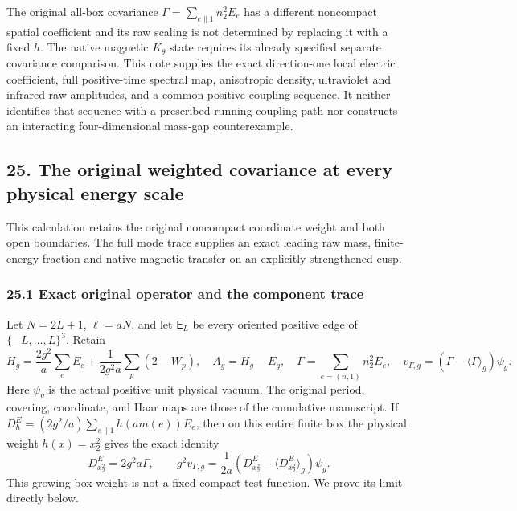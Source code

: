 \documentclass[
  11pt,
]{article}
\begin{document}
The original all-box covariance \(\Gamma=\sum_{e\parallel1}n_2^2E_e\)
has a different noncompact spatial coefficient and its raw scaling is
not determined by replacing it with a fixed \(h\). The native magnetic
\(K_\theta\) state requires its already specified separate covariance
comparison. This note supplies the exact direction-one local electric
coefficient, full positive-time spectral map, anisotropic density,
ultraviolet and infrared raw amplitudes, and a common positive-coupling
sequence. It neither identifies that sequence with a prescribed
running-coupling path nor constructs an interacting four-dimensional
mass-gap counterexample.

\subsection{25. The original weighted covariance at every physical
energy
scale}\label{the-original-weighted-covariance-at-every-physical-energy-scale}

This calculation retains the original noncompact coordinate weight and
both open boundaries. The full mode trace supplies an exact leading raw
mass, finite-energy fraction and native magnetic transfer on an
explicitly strengthened cusp.

\subsubsection{25.1 Exact original operator and the component
trace}\label{exact-original-operator-and-the-component-trace}

Let \(N=2L+1\), \(\ell=aN\), and let \(\mathsf E_L\) be every oriented
positive edge of \(\{-L,\ldots,L\}^3\). Retain \[
 H_g=\frac{2g^2}{a}\sum_e E_e+
 \frac1{2g^2a}\sum_p(2-W_p),\quad
 A_g=H_g-E_g,\quad
 \Gamma=\sum_{e=(n,1)}n_2^2E_e,\quad
 v_{\Gamma,g}=(\Gamma-\langle\Gamma\rangle_g)\psi_g .
 \tag{418}
\] Here \(\psi_g\) is the actual positive unit physical vacuum. The
original period, covering, coordinate, and Haar maps are those of the
cumulative manuscript. If
\(D^E_h=(2g^2/a)\sum_{e\parallel1}h(am(e))E_e\), then on this entire
finite box the physical weight \(h(x)=x_2^2\) gives the exact identity
\[
 D^E_{x_2^2}=2g^2a\Gamma,\qquad
 g^2v_{\Gamma,g}=\frac1{2a}
       (D^E_{x_2^2}-\langle D^E_{x_2^2}\rangle_g)\psi_g .
 \tag{419}
\] This growing-box weight is not a fixed compact test function. We
prove its limit directly below.
\end{document}
